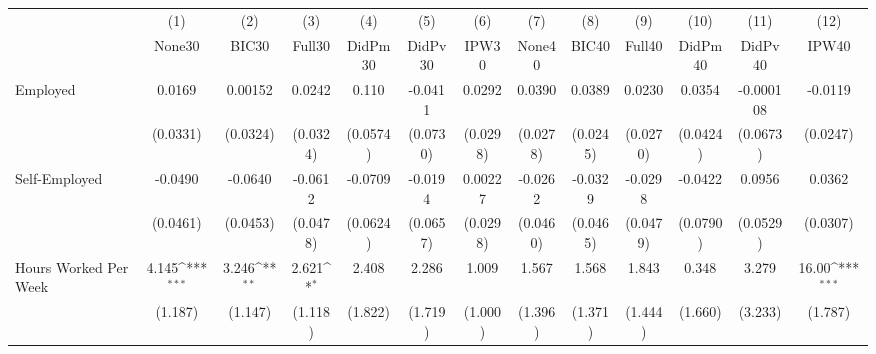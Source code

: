 {
\def\sym#1{\ifmmode^{#1}\else\(^{#1}\)\fi}
\begin{tabular}{l*{12}{c}}
\toprule
            &\multicolumn{1}{c}{(1)}&\multicolumn{1}{c}{(2)}&\multicolumn{1}{c}{(3)}&\multicolumn{1}{c}{(4)}&\multicolumn{1}{c}{(5)}&\multicolumn{1}{c}{(6)}&\multicolumn{1}{c}{(7)}&\multicolumn{1}{c}{(8)}&\multicolumn{1}{c}{(9)}&\multicolumn{1}{c}{(10)}&\multicolumn{1}{c}{(11)}&\multicolumn{1}{c}{(12)}\\
            &\multicolumn{1}{c}{None30}&\multicolumn{1}{c}{BIC30}&\multicolumn{1}{c}{Full30}&\multicolumn{1}{c}{DidPm30}&\multicolumn{1}{c}{DidPv30}&\multicolumn{1}{c}{IPW30}&\multicolumn{1}{c}{None40}&\multicolumn{1}{c}{BIC40}&\multicolumn{1}{c}{Full40}&\multicolumn{1}{c}{DidPm40}&\multicolumn{1}{c}{DidPv40}&\multicolumn{1}{c}{IPW40}\\
\midrule
Employed    &      0.0169         &     0.00152         &      0.0242         &       0.110         &     -0.0411         &      0.0292         &      0.0390         &      0.0389         &      0.0230         &      0.0354         &   -0.000108         &     -0.0119         \\
            &    (0.0331)         &    (0.0324)         &    (0.0324)         &    (0.0574)         &    (0.0730)         &    (0.0298)         &    (0.0278)         &    (0.0245)         &    (0.0270)         &    (0.0424)         &    (0.0673)         &    (0.0247)         \\
\addlinespace
Self-Employed&     -0.0490         &     -0.0640         &     -0.0612         &     -0.0709         &     -0.0194         &     0.00227         &     -0.0262         &     -0.0329         &     -0.0298         &     -0.0422         &      0.0956         &      0.0362         \\
            &    (0.0461)         &    (0.0453)         &    (0.0478)         &    (0.0624)         &    (0.0657)         &    (0.0298)         &    (0.0460)         &    (0.0465)         &    (0.0479)         &    (0.0790)         &    (0.0529)         &    (0.0307)         \\
\addlinespace
Hours Worked Per Week&       4.145\sym{***}&       3.246\sym{**} &       2.621\sym{*}  &       2.408         &       2.286         &       1.009         &       1.567         &       1.568         &       1.843         &       0.348         &       3.279         &       16.00\sym{***}\\
            &     (1.187)         &     (1.147)         &     (1.118)         &     (1.822)         &     (1.719)         &     (1.000)         &     (1.396)         &     (1.371)         &     (1.444)         &     (1.660)         &     (3.233)         &     (1.787)         \\

\end{tabular}}
